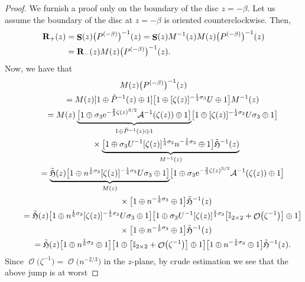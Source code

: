 \documentclass[10pt,a4paper]{amsart}
\DeclareMathOperator{\OO}{\mathcal{O}}
\DeclareMathOperator{\boldS}{{\bf S}}
\numberwithin{equation}{section}
\begin{document}
\begin{proof}
 We furnish a proof only on the boundary of the disc $z=-\beta$. Let us assume the boundary of the disc at $z=-\beta$ is oriented counterclockwise. Then,
 \begin{align*}
 {\bf R}_+(z) &{}= \boldS(z) \bigl(P^{(-\beta)}\bigr)^{-1}(z) = \boldS(z)M^{-1}(z)M(z) \bigl(P^{(-\beta)}\bigr)^{-1}(z) \\
 &{}= {\bf R}_-(z)M(z) \bigl(P^{(-\beta)}\bigr)^{-1}(z).
 \end{align*}
Now, we have that
 \begin{gather*}
 M(z) \bigl(P^{(-\beta)}\bigr)^{-1}(z)\\
 \qquad{}= M(z) [1\oplus \hat{P}^{-1}(z)\oplus 1] \bigl[1\oplus [\zeta(z)]^{-\frac{1}{4}\sigma_3}U \oplus 1\bigr] M^{-1}(z)\\
 \qquad{}= M(z)
 \underbrace{\bigl[1\oplus \sigma_3 {\rm e}^{-\frac{2}{3}\zeta(z)^{3/2}}\mathcal{A}^{-1}(\zeta(z))\oplus 1\bigr]}_{1\oplus \hat{P}^{-1}(z)\oplus 1}
 \bigl[1\oplus [\zeta(z)]^{-\frac{1}{4}\sigma_3}U\sigma_3 \oplus 1\bigr]\\
 \qquad\quad{}\times\underbrace{\bigl[1\oplus \sigma_3 U^{-1} [\zeta(z)]^{\frac{1}{4}\sigma_3}n^{-\frac{1}{6}\sigma_3}\oplus 1\bigr] \tilde{\mathfrak{H}}^{-1}(z)}_{M^{-1}(z)}\\
 \qquad{}=\underbrace{\tilde{\mathfrak{H}}(z) \bigl[1\oplus n^{\frac{1}{6}\sigma_3}[\zeta(z)]^{-\frac{1}{4}\sigma_3} U \sigma_3\oplus 1\bigr]}_{M(z)}
 \bigl[1\oplus \sigma_3 {\rm e}^{-\frac{2}{3}\zeta(z)^{3/2}}\mathcal{A}^{-1}(\zeta(z))\oplus 1\bigr]\\
 \qquad\quad{}\times \bigl[1\oplus n^{-\frac{1}{6}\sigma_3}\oplus 1\bigr] \tilde{\mathfrak{H}}^{-1}(z)\\
 \qquad{}=\tilde{\mathfrak{H}}(z) \bigl[1\oplus n^{\frac{1}{6}\sigma_3}[\zeta(z)]^{-\frac{1}{4}\sigma_3} U \sigma_3\oplus 1\bigr]
 \bigl[1\oplus \sigma_3 U^{-1}[\zeta(z)]^{\frac{1}{4}\sigma_3}\bigl[\mathbb{I}_{2\times 2} + \OO\bigl(\zeta^{-1}\bigr)\bigr]\oplus 1\bigr]\\
 \qquad\quad{}\times\bigl[1\oplus n^{-\frac{1}{6}\sigma_3}\oplus 1\bigr] \tilde{\mathfrak{H}}^{-1}(z)\\
 \qquad{}=\tilde{\mathfrak{H}}(z) \bigl[1\oplus n^{\frac{1}{6}\sigma_3}\oplus 1\bigr] \bigl[1\oplus\bigl[\mathbb{I}_{2\times 2} + \OO\bigl(\zeta^{-1}\bigr)\bigr]\oplus 1\bigr]\bigl[1\oplus n^{-\frac{1}{6}\sigma_3}\oplus 1\bigr] \tilde{\mathfrak{H}}^{-1}(z).
 \end{gather*}
 Since $\OO\bigl(\zeta^{-1}\bigr) = \OO\bigl(n^{-2/3}\bigr)$ in the $z$-plane, by crude estimation we see that the above jump is at worst

\end{proof}
\end{document}
